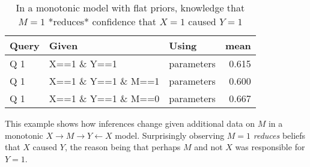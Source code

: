 \documentclass[
  12pt,
]{book}
\newenvironment{Shaded}{\begin{snugshade}}{\end{snugshade}}
\newcommand{\DataTypeTok}[1]{\textcolor[rgb]{0.13,0.29,0.53}{#1}}
\newcommand{\KeywordTok}[1]{\textcolor[rgb]{0.13,0.29,0.53}{\textbf{#1}}}
\newcommand{\NormalTok}[1]{#1}
\newcommand{\OperatorTok}[1]{\textcolor[rgb]{0.81,0.36,0.00}{\textbf{#1}}}
\newcommand{\StringTok}[1]{\textcolor[rgb]{0.31,0.60,0.02}{#1}}
\begin{document}
\begin{Shaded}
\end{Shaded}

\begin{table}

\caption{\label{tab:unnamed-chunk-43}In a monotonic model with flat priors, knowledge
    that $M=1$ *reduces* confidence that $X=1$ caused $Y=1$}
\centering
\begin{tabular}[t]{l|l|l|r}
\hline
Query & Given & Using & mean\\
\hline
Q 1 & X==1 \& Y==1 & parameters & 0.615\\
\hline
Q 1 & X==1 \& Y==1 \& M==1 & parameters & 0.600\\
\hline
Q 1 & X==1 \& Y==1 \& M==0 & parameters & 0.667\\
\hline
\end{tabular}
\end{table}

This example shows how inferences change given additional data on \(M\) in a monotonic \(X \rightarrow M \rightarrow Y \leftarrow X\) model. Surprisingly observing \(M=1\) \emph{reduces} beliefs that \(X\) caused \(Y\), the reason being that perhaps \(M\) and not \(X\) was responsible for \(Y=1\).
\end{document}
